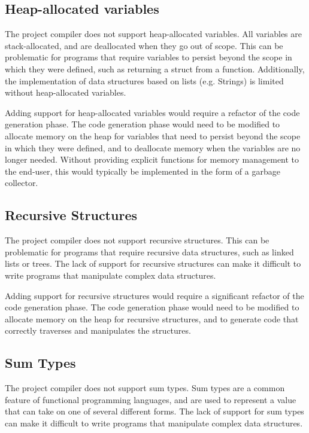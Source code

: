 \subsection{Heap-allocated variables}

The project compiler does not support heap-allocated variables. All variables are stack-allocated,
and are deallocated when they go out of scope. This can be problematic for programs that require
variables to persist beyond the scope in which they were defined, such as returning a struct from a
function. Additionally, the implementation of data structures based on lists (e.g. Strings) is
limited without heap-allocated variables.

Adding support for heap-allocated variables would require a refactor of the code generation phase.
The code generation phase would need to be modified to allocate memory on the heap for variables
that need to persist beyond the scope in which they were defined, and to deallocate memory when the
variables are no longer needed. Without providing explicit functions for memory management to the
end-user, this would typically be implemented in the form of a garbage collector.

\subsection{Recursive Structures}

The project compiler does not support recursive structures. This can be problematic for programs
that require recursive data structures, such as linked lists or trees. The lack of support for
recursive structures can make it difficult to write programs that manipulate complex data
structures.

Adding support for recursive structures would require a significant refactor of the code generation
phase. The code generation phase would need to be modified to allocate memory on the heap for
recursive structures, and to generate code that correctly traverses and manipulates the structures.

\subsection{Sum Types}

The project compiler does not support sum types. Sum types are a common feature of functional
programming languages, and are used to represent a value that can take on one of several different
forms. The lack of support for sum types can make it difficult to write programs that manipulate
complex data structures.

